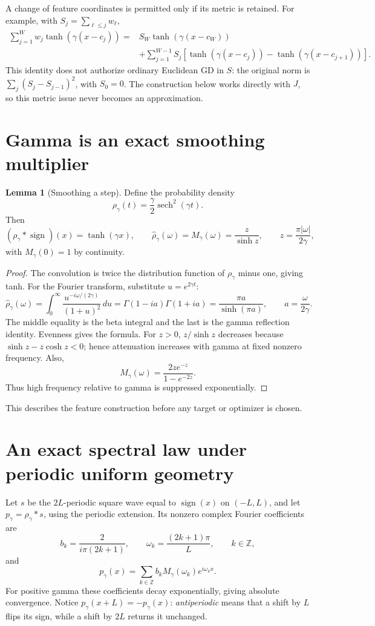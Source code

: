 \documentclass[11pt]{article}
\DeclareMathOperator{\sech}{sech}
\DeclareMathOperator{\sign}{sign}
\theoremstyle{definition}
\newtheorem{lemma}{Lemma}
\begin{document}
A change of feature coordinates is permitted only if its metric is retained.
For example, with $S_j=\sum_{\ell\le j}w_\ell$,
\begin{align*}
\sum_{j=1}^{W}w_j\tanh(\gamma(x-c_j))
={}&S_W\tanh(\gamma(x-c_W))\\
&+\sum_{j=1}^{W-1}S_j
[\tanh(\gamma(x-c_j))-\tanh(\gamma(x-c_{j+1}))].
\end{align*}
This identity does not authorize ordinary Euclidean GD in $S$: the original
norm is $\sum_j(S_j-S_{j-1})^2$, with $S_0=0$. The construction below works
directly with $J$, so this metric issue never becomes an approximation.

\section{Gamma is an exact smoothing multiplier}
\begin{lemma}[Smoothing a step]
Define the probability density
\[
\rho_\gamma(t)=\frac\gamma2\sech^2(\gamma t).
\]
Then
\[
(\rho_\gamma*\sign)(x)=\tanh(\gamma x),\qquad
\widehat\rho_\gamma(\omega)=M_\gamma(\omega)
=\frac{z}{\sinh z},\qquad z=\frac{\pi|\omega|}{2\gamma},
\]
with $M_\gamma(0)=1$ by continuity.
\end{lemma}
\begin{proof}
The convolution is twice the distribution function of $\rho_\gamma$ minus
one, giving tanh. For the Fourier transform, substitute $u=e^{2\gamma t}$:
\[
\widehat\rho_\gamma(\omega)
=\int_0^\infty\frac{u^{-i\omega/(2\gamma)}}{(1+u)^2}\,du
=\Gamma(1-ia)\Gamma(1+ia)
=\frac{\pi a}{\sinh(\pi a)},\qquad a=\frac\omega{2\gamma}.
\]
The middle equality is the beta integral and the last is the gamma reflection
identity. Evenness gives the formula. For $z>0$, $z/\sinh z$ decreases because
$\sinh z-z\cosh z<0$; hence attenuation increases with gamma at fixed nonzero
frequency. Also,
\[
M_\gamma(\omega)=\frac{2ze^{-z}}{1-e^{-2z}}.
\]
Thus high frequency relative to gamma is suppressed exponentially.
\end{proof}
This describes the feature construction before any target or optimizer is
chosen.

\section{An exact spectral law under periodic uniform geometry}
Let $s$ be the $2L$-periodic square wave equal to $\sign(x)$ on $(-L,L)$, and
let $p_\gamma=\rho_\gamma*s$, using the periodic extension. Its nonzero
complex Fourier coefficients are
\[
b_k=\frac2{i\pi(2k+1)},\qquad
\omega_k=\frac{(2k+1)\pi}{L},\qquad k\in\mathbb Z,
\]
and
\[
p_\gamma(x)=\sum_{k\in\mathbb Z}
b_kM_\gamma(\omega_k)e^{i\omega_kx}.
\]
For positive gamma these coefficients decay exponentially, giving absolute
convergence. Notice $p_\gamma(x+L)=-p_\gamma(x)$: \emph{antiperiodic} means
that a shift by $L$ flips its sign, while a shift by $2L$ returns it unchanged.
\end{document}

